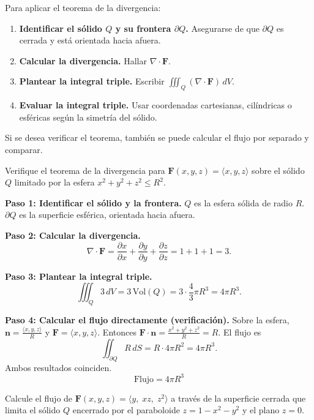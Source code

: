 \begin{pasos}
Para aplicar el teorema de la divergencia:
\begin{enumerate}
\item \textbf{Identificar el sólido $Q$ y su frontera $\partial Q$.} Asegurarse de que $\partial Q$ es cerrada y está orientada hacia afuera.
\item \textbf{Calcular la divergencia.} Hallar $\nabla\cdot\mathbf{F}$.
\item \textbf{Plantear la integral triple.} Escribir $\iiint_Q (\nabla\cdot\mathbf{F})\,dV$.
\item \textbf{Evaluar la integral triple.} Usar coordenadas cartesianas, cilíndricas o esféricas según la simetría del sólido.
\end{enumerate}
Si se desea verificar el teorema, también se puede calcular el flujo por separado y comparar.
\end{pasos}

\begin{example}
Verifique el teorema de la divergencia para $\mathbf{F}(x,y,z)=\langle x,y,z\rangle$ sobre el sólido $Q$ limitado por la esfera $x^2+y^2+z^2\le R^2$.
\end{example}

\begin{myproof}
\textbf{Paso 1: Identificar el sólido y la frontera.}
$Q$ es la esfera sólida de radio $R$. $\partial Q$ es la superficie esférica, orientada hacia afuera.

\textbf{Paso 2: Calcular la divergencia.}
\[
\nabla\cdot\mathbf{F} = \frac{\partial x}{\partial x}+\frac{\partial y}{\partial y}+\frac{\partial z}{\partial z} = 1+1+1=3.
\]

\textbf{Paso 3: Plantear la integral triple.}
\[
\iiint_Q 3\,dV = 3\,\text{Vol}(Q) = 3\cdot\frac{4}{3}\pi R^3 = 4\pi R^3.
\]

\textbf{Paso 4: Calcular el flujo directamente (verificación).}
Sobre la esfera, $\mathbf{n} = \frac{\langle x,y,z\rangle}{R}$ y $\mathbf{F}=\langle x,y,z\rangle$. Entonces $\mathbf{F}\cdot\mathbf{n} = \frac{x^2+y^2+z^2}{R} = R$. El flujo es
\[
\iint_{\partial Q} R\,dS = R\cdot 4\pi R^2 = 4\pi R^3.
\]
Ambos resultados coinciden.
\[
\boxed{\text{Flujo} = 4\pi R^3}
\]
\end{myproof}

\begin{example}
Calcule el flujo de $\mathbf{F}(x,y,z)=\langle y,\; xz,\; z^2\rangle$ a través de la superficie cerrada que limita el sólido $Q$ encerrado por el paraboloide $z=1-x^2-y^2$ y el plano $z=0$.
\end{example}

